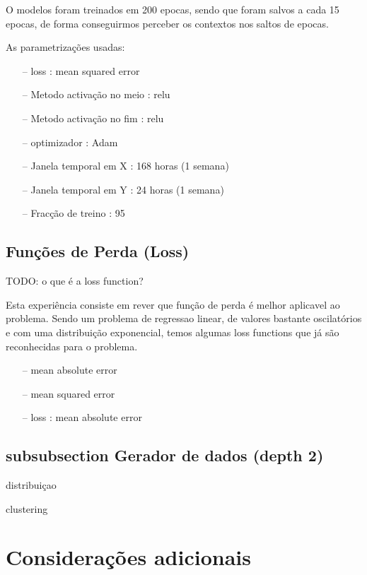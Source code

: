 O modelos foram treinados em 200 epocas, sendo que foram salvos a cada 15 epocas, de forma conseguirmos perceber os contextos nos saltos de epocas.

As parametrizações usadas:
\begin{itemize}
    \item[--] loss : mean squared error
    \item[--] Metodo activação no meio : relu
    \item[--] Metodo activação no fim : relu
    \item[--] optimizador : Adam
    \item[--] Janela temporal em X : 168 horas (1 semana)
    \item[--] Janela temporal em Y : 24 horas (1 semana)
    \item[--] Fracção de treino : 95%
\end{itemize}

\subsection{Funções de Perda (Loss)}

TODO: o que é a loss function?

Esta experiência consiste em rever que função de perda é melhor aplicavel ao problema. Sendo um problema de regressao linear, de valores bastante oscilatórios e com uma distribuição exponencial, temos algumas loss functions que já são reconhecidas para o problema.

\begin{itemize}
    \item[--] mean absolute error
    \item[--] mean squared error    
    \item[--] loss : mean absolute error

\end{itemize}



\subsection{subsubsection Gerador de dados (depth 2)}
distribuiçao

clustering


\section{Considerações adicionais  \label{se:dados_plus}}

